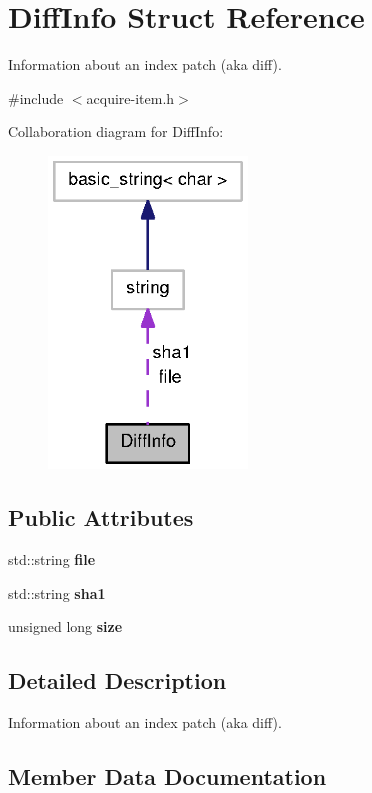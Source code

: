 \section{\-Diff\-Info \-Struct \-Reference}
\label{structDiffInfo}


\-Information about an index patch (aka diff).  




{\ttfamily \#include $<$acquire-\/item.\-h$>$}



\-Collaboration diagram for \-Diff\-Info\-:
\nopagebreak
\begin{figure}[H]
\begin{center}
\leavevmode
\includegraphics[width=150pt]{structDiffInfo__coll__graph}
\end{center}
\end{figure}
\subsection*{\-Public \-Attributes}
\begin{DoxyCompactItemize}
\item 
std\-::string {\bf file}
\item 
std\-::string {\bf sha1}
\item 
unsigned long {\bf size}
\end{DoxyCompactItemize}


\subsection{\-Detailed \-Description}
\-Information about an index patch (aka diff). 

\subsection{\-Member \-Data \-Documentation}

